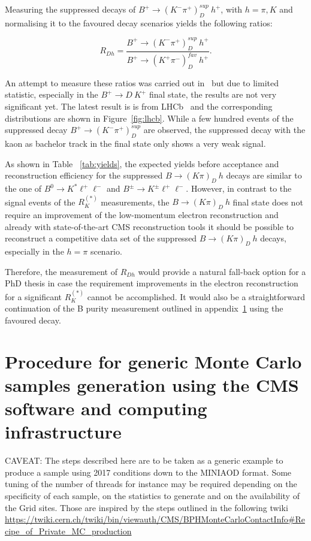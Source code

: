 \documentclass[a4paper,11pt]{article}
\begin{document}
Measuring  the suppressed decays of $B^{+} \rightarrow  (K^{-}  \pi^{+})_D^{sup}~ h^{+}$, with $h=\pi, K$ and normalising it to the favoured decay scenarios yields the following ratios: 

\[R_{Dh} = \frac{B^{+} \rightarrow  (K^{-}  \pi^{+})_D^{sup}~ h^{+}}{B^{+} \rightarrow  (K^{+}  \pi^{-})_D^{fav}~ h^{+}}. \]

An attempt to measure these ratios was carried out in~\cite{Aaij:2012kz, Aaltonen:2011uu, Saigo:2004de} but due to limited statistic, especially in the $B^{+} \rightarrow D~K^{+}$ final state, the results are not very significant yet. The latest result is is from LHCb~\cite{Aaij:2012kz} and the corresponding distributions are shown in Figure~\ref{fig:lhcb}.  While a few hundred events of the suppressed decay $B^{+} \rightarrow  (K^{-}  \pi^{+})_D^{sup}$ are observed, the suppressed decay with the kaon as bachelor track in the final state only shows a very weak signal.    
 

As shown in Table~ \ref{tab:yields}, the expected yields before acceptance and reconstruction efficiency for the suppressed $B \rightarrow  (K \pi)_D ~ h$ decays are similar to the one of $B^0\rightarrow K^* \ell^+\ell^-$ and $B^{\pm}\rightarrow K^{\pm} \ell^+\ell^-$. However, in contrast to the signal events of the $R_K^{(*)}$ measurements, the $B \rightarrow  (K \pi)_D ~ h$ final state does not require an improvement of the low-momentum electron reconstruction and already with state-of-the-art CMS reconstruction tools it should be possible to reconstruct a competitive data set of the  suppressed $B \rightarrow  (K \pi)_D ~ h$ decays, especially in the $h=\pi$ scenario. 

Therefore, the measurement of  $R_{Dh}$ would provide a natural fall-back option for a PhD thesis in case the requirement improvements in the electron reconstruction for a significant  $R_K^{(*)}$  cannot be accomplished.  It would also be a straightforward continuation of the B purity measurement outlined in appendix~\ref{A} using the favoured decay.     


\section{Procedure for generic Monte Carlo samples generation using the CMS software and computing infrastructure}\label{A}

CAVEAT: The steps described here are to be taken as a generic example to produce a sample using 2017 conditions down to the MINIAOD format. Some tuning of the number of threads for instance may be required depending on the specificity of each sample, on the statistics to generate and on the availability of the Grid sites. Those are inspired by the steps outlined in the following twiki
\url{https://twiki.cern.ch/twiki/bin/viewauth/CMS/BPHMonteCarloContactInfo#Recipe_of_Private_MC_production}
\end{document}

